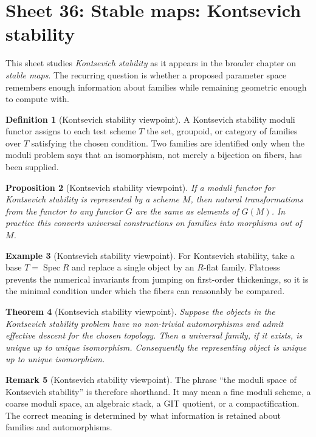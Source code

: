 \documentclass[11pt]{amsart}
\newtheorem{theorem}{Theorem}[section]
\newtheorem{proposition}[theorem]{Proposition}
\theoremstyle{definition}
\newtheorem{definition}[theorem]{Definition}
\newtheorem{example}[theorem]{Example}
\newtheorem{remark}[theorem]{Remark}
\newcommand{\Spec}{\operatorname{Spec}}
\begin{document}
\section{Sheet 36: Stable maps: Kontsevich stability}
This sheet studies \emph{Kontsevich stability} as it appears in the broader chapter on \emph{stable maps}.  The recurring question is whether a proposed parameter space remembers enough information about families while remaining geometric enough to compute with.
\begin{definition}[Kontsevich stability viewpoint]
A Kontsevich stability moduli functor assigns to each test scheme $T$ the set, groupoid, or category of families over $T$ satisfying the chosen condition.  Two families are identified only when the moduli problem says that an isomorphism, not merely a bijection on fibers, has been supplied.
\end{definition}
\begin{proposition}[Kontsevich stability viewpoint]
If a moduli functor for Kontsevich stability is represented by a scheme $M$, then natural transformations from the functor to any functor $G$ are the same as elements of $G(M)$.  In practice this converts universal constructions on families into morphisms out of $M$.
\end{proposition}
\begin{example}[Kontsevich stability viewpoint]
For Kontsevich stability, take a base $T=\Spec R$ and replace a single object by an $R$-flat family.  Flatness prevents the numerical invariants from jumping on first-order thickenings, so it is the minimal condition under which the fibers can reasonably be compared.
\end{example}
\begin{theorem}[Kontsevich stability viewpoint]
Suppose the objects in the Kontsevich stability problem have no non-trivial automorphisms and admit effective descent for the chosen topology.  Then a universal family, if it exists, is unique up to unique isomorphism.  Consequently the representing object is unique up to unique isomorphism.
\end{theorem}
\begin{remark}[Kontsevich stability viewpoint]
The phrase ``the moduli space of Kontsevich stability'' is therefore shorthand.  It may mean a fine moduli scheme, a coarse moduli space, an algebraic stack, a GIT quotient, or a compactification.  The correct meaning is determined by what information is retained about families and automorphisms.
\end{remark}
\end{document}
